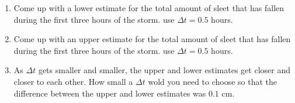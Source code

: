 \documentclass[12pt]{article}
\begin{document}
\begin{enumerate}
  \item Come up with a lower estimate for the total amount of sleet
    that has fallen during the first three hours of the storm. use
    $\Delta t = 0.5$ hours.
  \item Come up with an upper estimate for the total amount of sleet
    that has fallen during the first three hours of the storm. use
    $\Delta t = 0.5$ hours.
  \item As $\Delta t$ gets smaller and smaller, the upper and lower
    estimates get closer and closer to each other. How small a $\Delta
    t$ wold you need to choose so that the difference between the
    upper and lower estimates was $0.1$ cm.
\end{enumerate}



%

\end{document}
